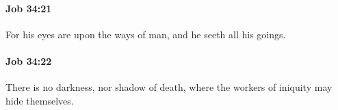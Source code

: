 		\paragraph{Job 34:21} %
			\label{JOB-34-21}

			For his eyes are upon the ways of man, and he seeth all his goings.


		\paragraph{Job 34:22} %
			\label{JOB-34-22}

			There is no darkness, nor shadow of death, where the workers of iniquity may hide themselves.


